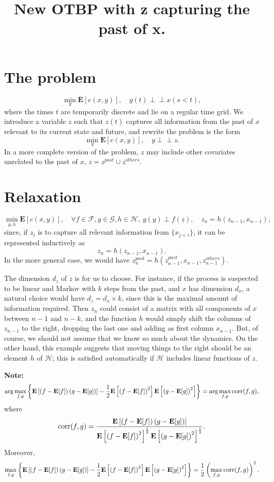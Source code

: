 \documentclass[a4paper,11pt]{article}
\newcommand{\indep}{\perp \!\!\! \perp}
\newcommand{\E}{\mathbf E}
\theoremstyle{definition}
\begin{document}
\title{New OTBP with z capturing the past of x.}


\maketitle


\section{The problem}


$$ \min_y \E[c(x, y)], \quad y(t) \indep x(s < t), $$
%
where the times $t$ are temporarily discrete and lie on a regular time grid. We introduce a variable $z$ such that $z(t)$ captures all information from the past of $x$ relevant to its current state and future, and rewrite the problem is the form
%
$$ \min_y \E[c(x, y)], \quad y \indep z. $$
%
In a more complete version of the problem, $z$ may include other covariates unrelated to the past of $x$, $z = z^{past} \cup z^{others}$.


\section{Relaxation}


$$ \min_{y, h} \E[c(x, y)], \quad \forall f \in \mathcal F, g \in \mathcal G, h \in \mathcal H,  \  g(y) \perp f(z), \quad z_n = h\left(z_{n-1}, x_{n-1} \right),  $$
%
since, if $z_i$ is to capture all relevant information from $\{x_{j < i}\}$, it can be represented inductively as
%
$$ z_n = h\left(z_{n-1}, x_{n-1} \right). $$
%
In the more general case, we would have
%
$ z^{past}_n = h\left(z^{past}_{n-1}, x_{n-1}, z^{others}_{n-1} \right)$.
%


The dimension $d_z$ of $z$ is for us to choose. For instance, if the process is suspected to be linear and Markov with $k$ steps from the past, and $x$ has dimension $d_x$, a natural choice would have $d_z = d_x \times k$, since this is the maximal amount of information required. Then  $z_n$ could consist of a matrix with all components of $x$ between $n-1$ and $n-k$, and the function $h$ would simply shift the columns of $z_{n-1}$ to the right, dropping the last one and adding as first column $x_{n-1}$. But, of course, we should not assume that we know so much about the dynamics. On the other hand, this example suggests that moving things to the right should be an element $h$ of $\mathcal H$; this is satisfied automatically if $\mathcal H$ includes linear functions of $z$.


\medskip
\noindent
{\bf Note:} 
%
$$  \arg\max_{f,g} \left\{\E\left[\left(f - \E[f]\right) \left(g - \E[g]\right) \right] - \frac{1}{2} \E\left[\left(f - \E[f]\right)^2\right] \E\left[\left(g - \E[g]\right)^2\right]\right\} =  
\arg\max_{f,g} \hbox{corr} (f, g), $$ 
%
where
%
$$ \hbox{corr} (f, g) = \frac{\E\left[\left(f - \E[f]\right) \left(g - \E[g]\right) \right]}{\E\left[\left(f - \E[f]\right)^2\right]^{\frac{1}{2}} \E\left[\left(g - \E[g]\right)^2\right]^{\frac{1}{2}}}. $$
%
Moreover,
%
$$  \max_{f,g} \left\{\E\left[\left(f - \E[f]\right) \left(g - \E[g]\right) \right] - \frac{1}{2} \E\left[\left(f - \E[f]\right)^2\right] \E\left[\left(g - \E[g]\right)^2\right]\right\} =  
\frac{1}{2} \left(\max_{f,g} \hbox{corr} (f, g)\right)^2. $$
\end{document}
